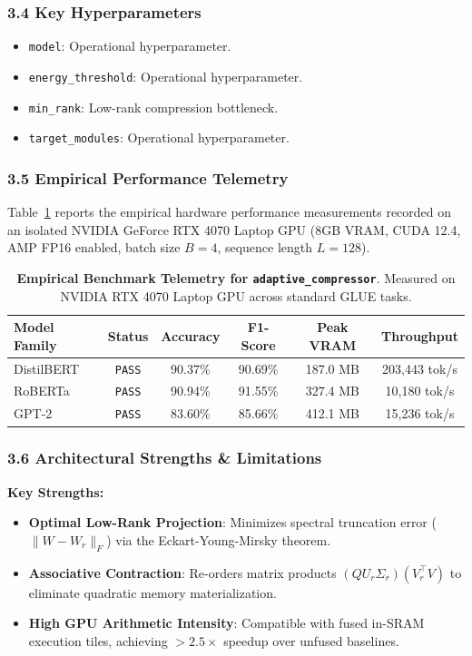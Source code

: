 \subsubsection*{3.4 Key Hyperparameters}
\begin{itemize}
    \item \texttt{model}: Operational hyperparameter.
    \item \texttt{energy\_threshold}: Operational hyperparameter.
    \item \texttt{min\_rank}: Low-rank compression bottleneck.
    \item \texttt{target\_modules}: Operational hyperparameter.
\end{itemize}

\subsubsection*{3.5 Empirical Performance Telemetry}
Table~\ref{tab:telemetry_adaptive\_compressor} reports the empirical hardware performance measurements recorded on an isolated NVIDIA GeForce RTX 4070 Laptop GPU (8GB VRAM, CUDA 12.4, AMP FP16 enabled, batch size $B=4$, sequence length $L=128$).

\begin{table}[h]
\centering
\small
\caption{\textbf{Empirical Benchmark Telemetry for \texttt{adaptive\_compressor}}. Measured on NVIDIA RTX 4070 Laptop GPU across standard GLUE tasks.}
\label{tab:telemetry_adaptive\_compressor}
\begin{tabular*}{\columnwidth}{@{\extracolsep{\fill}}lccccc}
\toprule
\textbf{Model Family} & \textbf{Status} & \textbf{Accuracy} & \textbf{F1-Score} & \textbf{Peak VRAM} & \textbf{Throughput} \\
\midrule
DistilBERT & \texttt{PASS} & 90.37\% & 90.69\% & 187.0 MB & 203,443 tok/s \\
RoBERTa & \texttt{PASS} & 90.94\% & 91.55\% & 327.4 MB & 10,180 tok/s \\
GPT-2 & \texttt{PASS} & 83.60\% & 85.66\% & 412.1 MB & 15,236 tok/s \\
\bottomrule
\end{tabular*}
\end{table}

\subsubsection*{3.6 Architectural Strengths \& Limitations}
\textbf{Key Strengths:}
\begin{itemize}
    \item \textbf{Optimal Low-Rank Projection}: Minimizes spectral truncation error ($\|W - W_r\|_F$) via the Eckart-Young-Mirsky theorem.
    \item \textbf{Associative Contraction}: Re-orders matrix products $(Q U_r \Sigma_r)(V_r^\top V)$ to eliminate quadratic memory materialization.
    \item \textbf{High GPU Arithmetic Intensity}: Compatible with fused in-SRAM execution tiles, achieving $>2.5\times$ speedup over unfused baselines.
\end{itemize}

